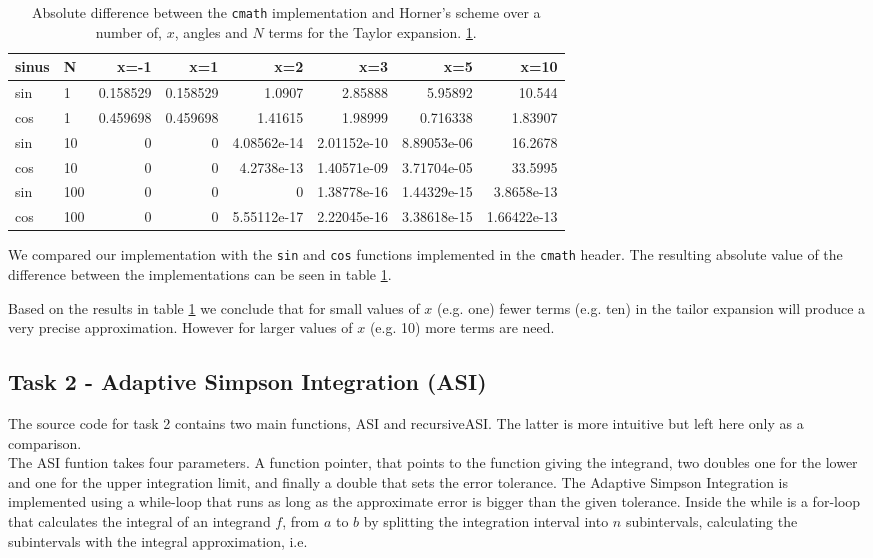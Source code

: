 \documentclass[paper=a4, fontsize=11pt]{article} %
\begin{document}
\begin{table}[H]
\begin{tabular}{ l | l | r r r r r r}
  sinus & N   & x=-1     & x=1      & x=2         & x=3         & x=5         & x=10        \\
  \hline
  sin   & 1   & 0.158529 & 0.158529 & 1.0907      & 2.85888     & 5.95892     & 10.544      \\
  cos   & 1   & 0.459698 & 0.459698 & 1.41615     & 1.98999     & 0.716338    & 1.83907     \\
  sin   & 10  & 0        & 0        & 4.08562e-14 & 2.01152e-10 & 8.89053e-06 & 16.2678     \\
  cos   & 10  & 0        & 0        & 4.2738e-13  & 1.40571e-09 & 3.71704e-05 & 33.5995     \\
  sin   & 100 & 0        & 0        & 0           & 1.38778e-16 & 1.44329e-15 & 3.8658e-13  \\
  cos   & 100 & 0        & 0        & 5.55112e-17 & 2.22045e-16 & 3.38618e-15 & 1.66422e-13 \\
\end{tabular}
\caption{ Absolute difference between the \lstinline$cmath$
  implementation and Horner's scheme over a number of, $x$, angles and
  $N$ terms for the Taylor expansion.  \ref{tab:t1-errors}.}
\label{tab:t1-errors}
\end{table}


We compared our implementation with the \lstinline$sin$ and
\lstinline$cos$ functions implemented in the \lstinline$cmath$
header. The resulting absolute value of the difference between the
implementations can be seen in table \ref{tab:t1-errors}.

Based on the results in table \ref{tab:t1-errors} we conclude that for
small values of $x$ (e.g. one) fewer terms (e.g. ten) in the tailor
expansion will produce a very precise approximation. However for
larger values of $x$ (e.g. 10) more terms are need.


\subsection{Task 2 - Adaptive Simpson Integration (ASI)}


The source code for task 2 contains two main functions, ASI and recursiveASI. The latter is more intuitive but left here only as a comparison.\\

The ASI funtion takes four parameters. A function pointer, that points to the function giving the integrand, two doubles one for the lower and one  for the upper integration limit, and finally a double that sets the error tolerance. The Adaptive Simpson Integration is implemented using a while-loop that runs as long as the approximate error is bigger than the given tolerance. Inside the while is a for-loop that calculates the integral of an integrand $f$, from $a$ to $b$ by splitting the integration interval into $n$ subintervals, calculating the subintervals with the integral approximation, i.e.
\end{document}
